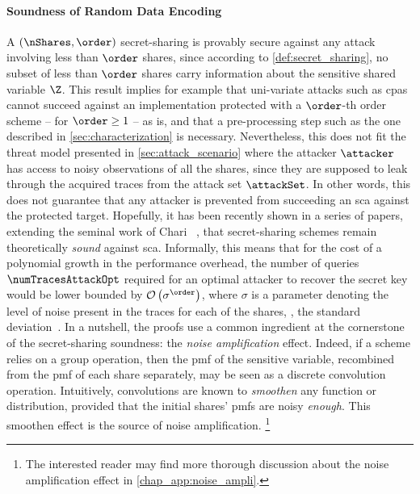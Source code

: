\paragraph{Soundness of Random Data Encoding}
\label{sec:soundness_masking}
A \((\nShares, \order)\) secret-sharing is provably secure against any attack involving less than \(\order\) shares, since according to \autoref{def:secret_sharing}, no subset of less than \(\order\) shares carry information about the sensitive shared variable \(\Z\).
This result implies for example that uni-variate attacks such as \glspl{cpa} cannot succeed against an implementation protected with a \(\order\)-th order scheme -- for \(\order \geq 1\) -- as is, and that a pre-processing step such as the one described in \autoref{sec:characterization} is necessary.
Nevertheless, this does not fit the threat model presented in \autoref{sec:attack_scenario} where the attacker \(\attacker\) has access to noisy observations of all the shares, since they are supposed to leak through the acquired traces from the attack set \(\attackSet\).
In other words, this does not guarantee that any attacker is prevented from succeeding an \gls{sca} against the protected target.
Hopefully, it has been recently shown in a series of papers, extending the seminal work of Chari \etal{}~\cite{chari_towards_1999}, that secret-sharing schemes remain theoretically \emph{sound} against \gls{sca}.
Informally, this means that for the cost of a polynomial growth in the performance overhead, the number of queries \(\numTracesAttackOpt\) required for an optimal attacker to recover the secret key would be lower bounded by \(\mathcal{O}\left(\sigma^\order \right)\), where \(\sigma\) is a parameter denoting the level of noise present in the traces for each of the shares, \eg{}, the standard deviation~\cite{prouff_masking_2013,duc_unifying_2019,duc_making_2019,dziembowski_optimal_2016,prest_renyi_2019}.
In a nutshell, the proofs use a common ingredient at the cornerstone of the secret-sharing soundness: the \emph{noise amplification} effect.
Indeed, if a scheme relies on a group operation, then the \gls{pmf} of the sensitive variable, recombined from the \gls{pmf} of each share separately, may be seen as a discrete convolution operation.
Intuitively, convolutions are known to \emph{smoothen} any function or distribution, provided that the initial shares' \glspl{pmf} are noisy \emph{enough}.
This smoothen effect is the source of noise amplification.%
\footnote{
    The interested reader may find more thorough discussion about the noise amplification effect in \autoref{chap_app:noise_ampli}.
}